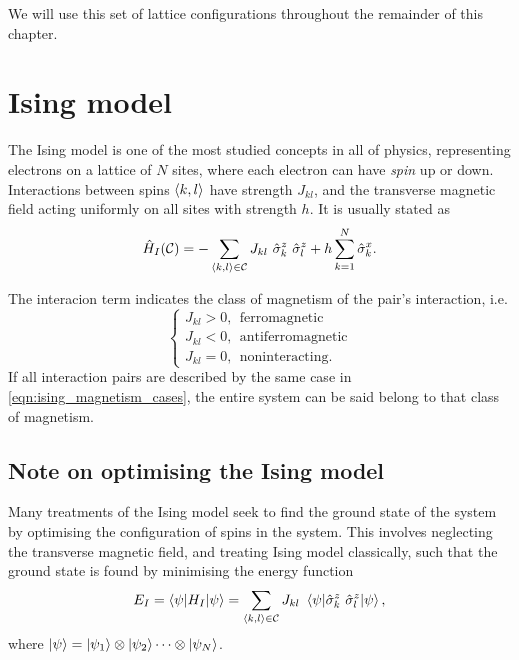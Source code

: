We will use this set of lattice configurations throughout the remainder of this chapter. 

\section{Ising model}\label{sec:ising}
The Ising model is one of the most studied concepts in all of physics, 
    representing electrons on a lattice of $N$ sites, 
    where each electron can have \emph{spin} up or down.
Interactions between spins ${ \langle k, l \rangle }$ have strength $J_{kl}$, 
    and the transverse magnetic field acting uniformly on all sites with strength $h$. 
It is usually stated as 
\begin{equation}
    \label{eqn:ising_standard_form}
    \hat{H}_I(\cc) = -\sum_{\bkl \in \mathcal{C}} J_{kl}  \ \hat{\sigma}_k^z \ \hat{\sigma}_{l}^z + h \sum_{k=1}^{N} \hat{\sigma}_{k}^x.
\end{equation}

The interacion term indicates the class of magnetism of the pair's interaction, i.e. 
\begin{equation}
    \label{eqn:ising_magnetism_cases}
    \begin{cases}
        J_{kl} > 0, \ \ \textrm{ferromagnetic} \\
        J_{kl} < 0, \ \ \textrm{antiferromagnetic} \\
        J_{kl} = 0, \ \ \textrm{noninteracting}.
    \end{cases}
\end{equation}
If all interaction pairs are described by the same case in \cref{eqn:ising_magnetism_cases}, 
    the entire system can be said belong to that class of magnetism. 

\par 
\subsection{Note on optimising the Ising model}\label{sec:ising_optimisation}
Many treatments of the Ising model seek to find the ground state
    of the system by optimising the configuration of spins in the system. 
This involves neglecting the transverse magnetic field, and treating Ising model classically, 
    such that the ground state is found by minimising the energy function
\begin{equation}
    \label{eqn:ising_energy_function}
    E_I = \braket{\psi | H_I | \psi} = 
    \sum_{{ \langle k, l \rangle } \in \mathcal{C}} J_{kl}  \ \braket{ \psi |  \hat{\sigma}_k^z \ \hat{\sigma}_{l}^z | \psi }, 
\end{equation}
    where $\ket{\psi} = \ket{\psi_1} \otimes \ket{\psi_2} \dots \otimes \ket{\psi_N}$. 

